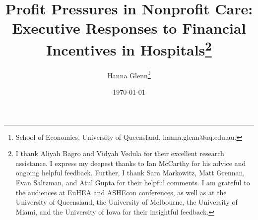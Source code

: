 \documentclass[12pt]{article}
\theoremstyle{definition}   %
\begin{document}
	
	
	
	
	\linespread{1.2}\title{\vspace{-0.5in} Profit Pressures in Nonprofit Care:\\ \large Executive Responses to Financial Incentives in Hospitals\thanks{I thank Aliyah Bagro and Vidyah Vedula for their excellent research assistance. I express my deepest thanks to Ian McCarthy for his advice and ongoing helpful feedback. Further, I thank Sara Markowitz, Matt Grennan, Evan Saltzman, and Atul Gupta for their helpful comments. I am grateful to the audiences at EuHEA and ASHEcon conferences, as well as at the University of Queensland, the University of Melbourne, the University of Miami, and the University of Iowa for their insightful feedback.}} 
	
	\date{\today}
	
	\author{\vspace{10mm}Hanna Glenn\footnote{School of Economics, University of Queensland, hanna.glenn@uq.edu.au.}
    }
    
	
	\maketitle
	
	\vspace{-0.2in}
	
	\singlespacing\maketitle


 \vspace{3mm}
	
\end{document}

